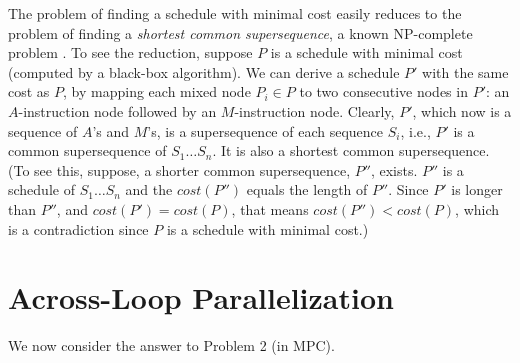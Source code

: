 \documentclass[sigconf, screen, natbib=false, dvipsnames, table]{acmart}
\theoremstyle{definition}
\begin{document}
The problem of finding a schedule with minimal cost 
easily reduces to the problem of finding a \emph{shortest common supersequence}, 
a known NP-complete problem . To see the reduction, 
suppose $P$ is a schedule with minimal cost (computed by a black-box algorithm). 
We can derive a schedule $P'$ with the same cost as $P$, by mapping each mixed node $P_i \in P$ 
to two consecutive nodes in $P'$: an $A$-instruction node followed by an $M$-instruction node.
Clearly, $P'$, which now is a sequence of $A$'s and $M$'s, is a supersequence of each sequence 
$S_i$, i.e., $P'$ is a common supersequence 
of $S_1 \dots S_n$. It is also a shortest common supersequence. (To see this, suppose, a 
shorter common supersequence, $P''$, exists. $P''$ is a schedule of $S_1 \dots S_n$
and the $\mathit{cost}(P'')$ equals the length of $P''$. Since $P'$ is longer than
$P''$, and $\mathit{cost}(P') = \mathit{cost}(P)$, that means $\mathit{cost}(P'') < \mathit{cost}(P)$, 
which is a contradiction since $P$ is a schedule with minimal cost.)




\section{Across-Loop Parallelization} 
\label{sec:optimal_loop_parallelization}
%

We now consider the answer to Problem 2 (in MPC). 
\end{document}
